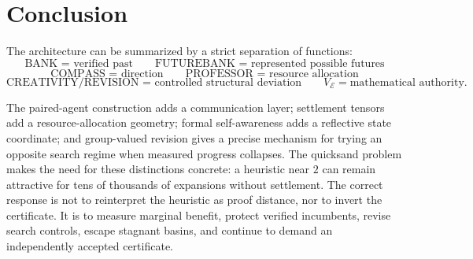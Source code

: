 \documentclass[11pt]{article}
\newcommand{\Env}{\mathcal{E}}
\begin{document}
\section{Conclusion}

The architecture can be summarized by a strict separation of functions:
\[
\boxed{\text{BANK = verified past}}
\qquad
\boxed{\text{FUTUREBANK = represented possible futures}}
\]
\[
\boxed{\text{COMPASS = direction}}
\qquad
\boxed{\text{PROFESSOR = resource allocation}}
\]
\[
\boxed{\text{CREATIVITY/REVISION = controlled structural deviation}}
\qquad
\boxed{V_{\Env}=\text{mathematical authority}.}
\]

The paired-agent construction adds a communication layer; settlement tensors add a resource-allocation geometry; formal self-awareness adds a reflective state coordinate; and group-valued revision gives a precise mechanism for trying an opposite search regime when measured progress collapses. The quicksand problem makes the need for these distinctions concrete: a heuristic near $2$ can remain attractive for tens of thousands of expansions without settlement. The correct response is not to reinterpret the heuristic as proof distance, nor to invert the certificate. It is to measure marginal benefit, protect verified incumbents, revise search controls, escape stagnant basins, and continue to demand an independently accepted certificate.
\end{document}
